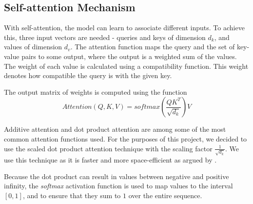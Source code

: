 \subsection{Self-attention Mechanism}\label{sec:self-attention mechanism}
With self-attention, the model can learn to associate different inputs.
To achieve this, three input vectors are needed - queries and keys of dimension $d_k$, and values of dimension $d_v$.
The attention function maps the query and the set of key-value pairs to some output, where the output is a weighted sum of the values.
The weight of each value is calculated using a compatibility function.
This weight denotes how compatible the query is with the given key.



The output matrix of weights is computed using the function
$$
Attention(Q, K, V) = softmax(\frac{QK^T}{\sqrt{d_k}})V
$$

Additive attention and dot product attention are among some of the most common attention functions used.
For the purposes of this project, we decided to use the scaled dot product attention technique with the scaling factor $\frac{1}{\sqrt{d_k}}$.
We use this technique as it is faster and more space-efficient as argued by \citet{AttentionIsAllYouNeed}.

Because the dot product can result in values between negative and positive infinity, the \textit{softmax} activation function is used to map values to the interval $[0,1]$, and to ensure that they sum to $1$ over the entire sequence. \cite{AttentionIsAllYouNeed}
